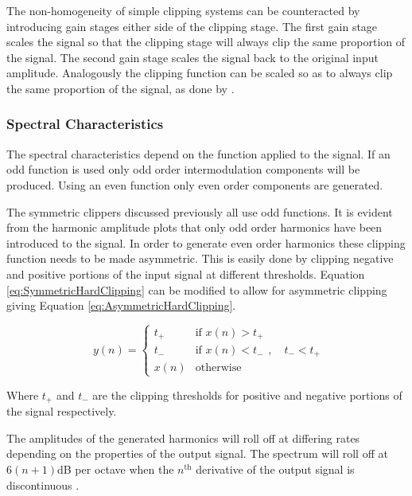 			The non-homogeneity of simple clipping systems can be counteracted by introducing gain stages either
			side of the clipping stage. The first gain stage scales the signal so that the clipping stage will
			always clip the same proportion of the signal. The second gain stage scales the signal back to the
			original input amplitude. Analogously the clipping function can be scaled so as to always clip the
			same proportion of the signal, as done by \citet{deman2014adaptive}.

		\subsubsection*{Spectral Characteristics}
			The spectral characteristics depend on the function applied to the signal. If an odd function is
			used only odd order intermodulation components will be produced. Using an even function only even
			order components are generated. 

			The symmetric clippers discussed previously all use odd functions. It is evident from the harmonic
			amplitude plots that only odd order harmonics have been introduced to the signal. In order to
			generate even order harmonics these clipping function needs to be made asymmetric. This is easily
			done by clipping negative and positive portions of the input signal at different thresholds.
			Equation \ref{eq:SymmetricHardClipping} can be modified to allow for asymmetric clipping giving
			Equation \ref{eq:AsymmetricHardClipping}.
			
			\begin{equation}
				y(n) = \begin{cases}
					t_{+} & \text{if $x(n) > t_{+}$} \\
					t_{-} & \text{if $x(n) < t_{-}$} \\
					x(n) & \text{otherwise}
				\end{cases}, \quad t_{-} < t_{+}
				\label{eq:AsymmetricHardClipping}
			\end{equation}

			Where $t_{+}$ and $t_{-}$ are the clipping thresholds for positive and negative portions of the
			signal respectively.	

			The amplitudes of the generated harmonics will roll off at differing rates depending on the
			properties of the output signal. The spectrum will roll off at $6(n+1)$dB per octave when the
			$n^{\text{th}}$ derivative of the output signal is discontinuous \citep{kraght2000aliasing}.

